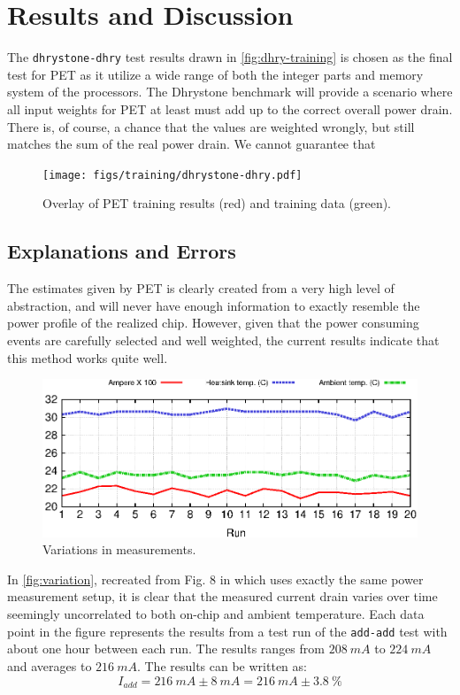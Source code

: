 \section{Results and Discussion}

The \texttt{dhrystone-dhry} test results drawn in \autoref{fig:dhry-training}
is chosen as the final test for PET as it utilize a wide range of both the
integer parts and memory system of the processors. The Dhrystone benchmark will
provide a scenario where all input weights for PET at least must add up to the correct
overall power drain. There is, of course, a chance that the values are weighted wrongly, but
still matches the sum of the real power drain. We cannot guarantee that 


\begin{figure}[ht]
\centering
\texttt{[image: figs/training/dhrystone-dhry.pdf]}
\caption{Overlay of PET training results (red) and training data (green).}
\label{fig:dhry-training}
\end{figure}

\subsection{Explanations and Errors}
The estimates given by PET is clearly created from a very high level of abstraction,
and will never have enough information to exactly resemble the power profile of
the realized chip. However, given that the power consuming events are carefully
selected and well weighted, the current results indicate that this method works quite well.

\begin{figure}[ht]
    \includegraphics{figs/heat}
    \caption{Variations in measurements.}
    \label{fig:variation}
\end{figure}

In \autoref{fig:variation}, recreated from Fig. 8 in \cite{rundehvatum2013exploring} which uses exactly the
same power measurement setup, it is clear that the measured current drain varies over
time seemingly uncorrelated to both on-chip and ambient temperature. Each data point
in the figure represents the results from a test run of the \texttt{add-add} test with
about one hour between each run. The results ranges from $208~mA$ to $224~mA$ and averages to $216~mA$.
The results can be written as:
\[I_{add} = 216~mA\pm8~mA = 216~mA\pm3.8~\%\]

